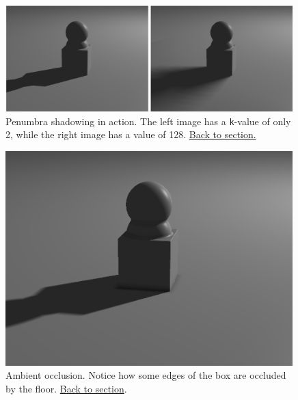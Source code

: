 \documentclass[abstract=off,oneside]{scrreprt}
\begin{document}
\begin{figure}[htb]
\centering
\includegraphics[width=0.99\textwidth]{./img/penumbra.png}
\caption*{\label{fig:penumbra}Penumbra shadowing in action. The left image has a \verb~k~-value of only 2, while the right image has a value of 128. \hyperref[sec:shadows]{Back to section.}}
\end{figure}

\begin{figure}[htb]
\centering
\includegraphics[width=0.99\textwidth]{./img/ao.png}
\caption*{\label{fig:ao}Ambient occlusion. Notice how some edges of the box are occluded by the floor. \hyperref[sec:ao]{Back to section}.}
\end{figure}
\end{document}

